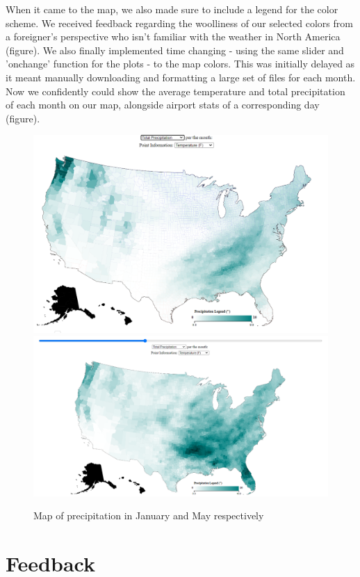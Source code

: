 \documentclass[10pt,twocolumn,twoside]{opticajnl}
\begin{document}
When it came to the map, we also made sure to include a legend for the color scheme. We received feedback regarding the woolliness of our selected colors from a foreigner's perspective who isn't familiar with the weather in North America (figure). We also finally implemented time changing - using the same slider and 'onchange' function for the plots - to the map colors. This was initially delayed as it meant manually downloading and formatting a large set of files for each month. Now we confidently could show the average temperature and total precipitation of each month on our map, alongside airport stats of a corresponding day (figure).

\begin{figure}
	\centering
	\includegraphics[scale=0.15]{images/precMap.png}
	\includegraphics[scale=0.15]{images/precMapMay.png}
	\caption{Map of precipitation in January and May respectively}
\end{figure}

\section {Feedback}
\end{document}

